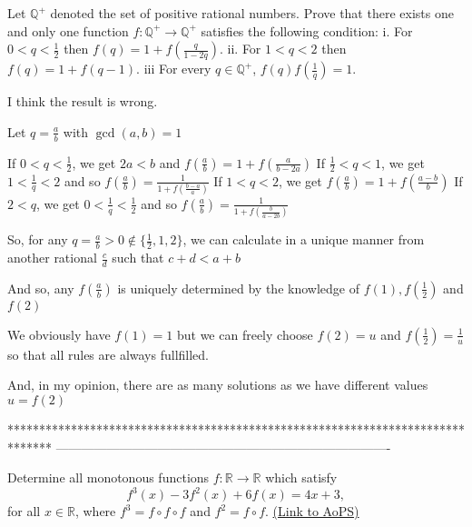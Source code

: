 \begin{solution}
	\begin{tcolorbox}Let $ \mathbb{Q}^ +$ denoted the set of positive rational numbers. Prove that there exists one and only one function $ f: \mathbb{Q}^ + \to \mathbb{Q}^ +$ satisfies the following condition:
i. For $ 0 < q < \frac {1}{2}$ then $ f(q) = 1 + f(\frac {q}{1 - 2q})$.
ii. For $ 1 < q < 2$ then $ f(q) = 1 + f(q - 1)$.
iii For every $ q\in\mathbb{Q}^ +$, $ f(q)f(\frac {1}{q}) = 1$.\end{tcolorbox}

I think the result is wrong.

Let $ q=\frac ab$ with $ \gcd(a,b)=1$

If $ 0<q<\frac 12$, we get $ 2a<b$ and  $ f(\frac ab)=1+f(\frac a{b-2a})$
If $ \frac 12<q<1$, we get $ 1<\frac 1q<2$ and so $ f(\frac ab)=\frac 1{1+f(\frac {b-a}a)}$
If $ 1<q<2$, we get $ f(\frac ab)=1+f(\frac{a-b}b)$
If $ 2<q$, we get $ 0<\frac 1q<\frac 12$ and so $ f(\frac ab)=\frac 1{1+f(\frac b{a-2b})}$

So, for any $ q=\frac ab>0\notin\{\frac 12,1,2\}$, we can calculate in a unique manner from another rational $ \frac cd$ such that $ c+d<a+b$

And so, any $ f(\frac ab)$ is uniquely determined by the knowledge of $ f(1),f(\frac 12)$ and $ f(2)$

We obviously have $ f(1)=1$ but we can freely choose $ f(2)=u$ and $ f(\frac 12)=\frac 1u$ so that all rules are always fullfilled.

And, in my opinion, there are as many solutions as we have different values $ u=f(2)$
\end{solution}
*******************************************************************************
-------------------------------------------------------------------------------

\begin{problem}
	Determine all monotonous functions $ f: \mathbb{R} \rightarrow \mathbb{R}$ which satisfy \[ f^3(x)-3f^2(x)+6f(x)=4x+3,\] for all $x \in \mathbb{R}$, where $ f^3=f \circ f \circ f$ and $ f^2=f \circ f$.
	\flushright \href{https://artofproblemsolving.com/community/c6h307281}{(Link to AoPS)}
\end{problem}



